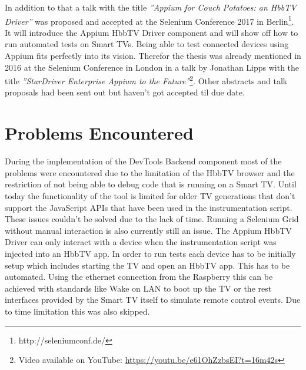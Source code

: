 In addition to that a talk with the title \textit{''Appium for Couch Potatoes: an HbbTV Driver''} was proposed and
accepted at the Selenium Conference 2017 in Berlin\footnote{http://seleniumconf.de/}. It will introduce the Appium
HbbTV Driver component and will show off how to run automated tests on Smart TVs. Being able to test connected
devices using Appium fits perfectly into its vision. Therefor the thesis was already mentioned in 2016 at the
Selenium Conference in London in a talk by Jonathan Lipps with the title \textit{''StarDriver Enterprise Appium
to the Future''}\footnote{Video available on YouTube: \url{https://youtu.be/e61OhZzbsEI?t=16m42s}}. Other abstracts
and talk proposals had been sent out but haven't got accepted til due date.

\section{Problems Encountered\label{sec:problems}}


During the implementation of the DevTools Backend component most of the problems were encountered due to the limitation
of the HbbTV browser and the restriction of not being able to debug code that is running on a Smart TV. Until today
the functionality of the tool is limited for older TV generations that don't support the JavaScript APIs that have
been used in the instrumentation script. These issues couldn't be solved due to the lack of time. Running a Selenium
Grid without manual interaction is also currently still an issue. The Appium HbbTV Driver can only interact with a
device when the instrumentation script was injected into an HbbTV app. In order to run tests each device has to be
initially setup which includes starting the TV and open an HbbTV app. This has to be automated. Using the ethernet
connection from the Raspberry this can be achieved with standards like Wake on LAN to boot up the TV or the rest
interfaces provided by the Smart TV itself to simulate remote control events. Due to time limitation this was also
skipped.

